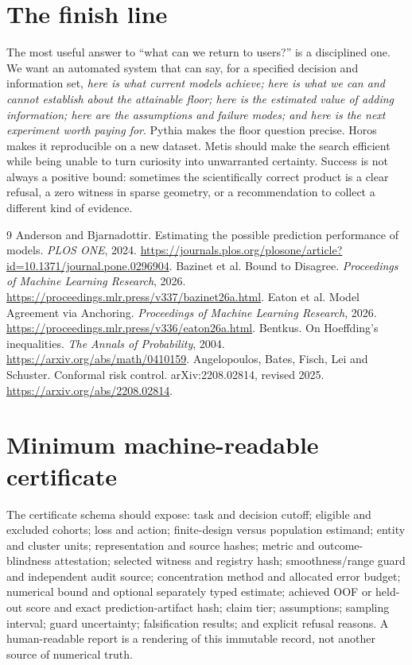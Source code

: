 \documentclass[11pt]{article}
\begin{document}
\section{The finish line}
The most useful answer to ``what can we return to users?'' is a disciplined one. We want an automated system that can say, for a specified decision and information set, \emph{here is what current models achieve; here is what we can and cannot establish about the attainable floor; here is the estimated value of adding information; here are the assumptions and failure modes; and here is the next experiment worth paying for}. Pythia makes the floor question precise. Horos makes it reproducible on a new dataset. Metis should make the search efficient while being unable to turn curiosity into unwarranted certainty. Success is not always a positive bound: sometimes the scientifically correct product is a clear refusal, a zero witness in sparse geometry, or a recommendation to collect a different kind of evidence.

\begin{thebibliography}{9}
 Anderson and Bjarnadottir. Estimating the possible prediction performance of models. \emph{PLOS ONE}, 2024. \url{https://journals.plos.org/plosone/article?id=10.1371/journal.pone.0296904}.
 Bazinet et al. Bound to Disagree. \emph{Proceedings of Machine Learning Research}, 2026. \url{https://proceedings.mlr.press/v337/bazinet26a.html}.
 Eaton et al. Model Agreement via Anchoring. \emph{Proceedings of Machine Learning Research}, 2026. \url{https://proceedings.mlr.press/v336/eaton26a.html}.
 Bentkus. On Hoeffding's inequalities. \emph{The Annals of Probability}, 2004. \url{https://arxiv.org/abs/math/0410159}.
 Angelopoulos, Bates, Fisch, Lei and Schuster. Conformal risk control. arXiv:2208.02814, revised 2025. \url{https://arxiv.org/abs/2208.02814}.
\end{thebibliography}

\appendix
\section{Minimum machine-readable certificate}
The certificate schema should expose: task and decision cutoff; eligible and excluded cohorts; loss and action; finite-design versus population estimand; entity and cluster units; representation and source hashes; metric and outcome-blindness attestation; selected witness and registry hash; smoothness/range guard and independent audit source; concentration method and allocated error budget; numerical bound and optional separately typed estimate; achieved OOF or held-out score and exact prediction-artifact hash; claim tier; assumptions; sampling interval; guard uncertainty; falsification results; and explicit refusal reasons. A human-readable report is a rendering of this immutable record, not another source of numerical truth.
\end{document}
